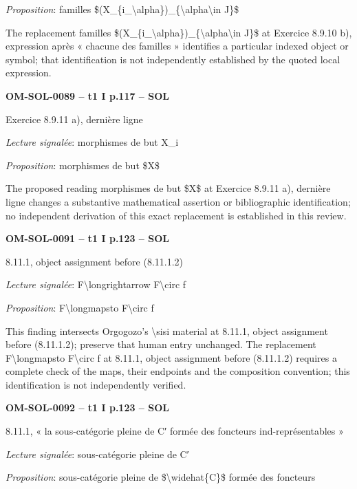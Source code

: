 \emph{Proposition}: familles \$(X\_\{i\_\textbackslash{}alpha\})\_\{\textbackslash{}alpha\textbackslash{}in J\}\$\par
The replacement familles \$(X\_\{i\_\textbackslash{}alpha\})\_\{\textbackslash{}alpha\textbackslash{}in J\}\$ at Exercice 8.9.10 b), expression après « chacune des familles » identifies a particular indexed object or symbol; that identification is not independently established by the quoted local expression.\par
\par\noindent\textbf{OM-SOL-0089 -- t1 I p.117 -- SOL}\par
Exercice 8.9.11 a), dernière ligne\par
\emph{Lecture signalée}: morphismes de but X\_i\par
\emph{Proposition}: morphismes de but \$X\$\par
The proposed reading morphismes de but \$X\$ at Exercice 8.9.11 a), dernière ligne changes a substantive mathematical assertion or bibliographic identification; no independent derivation of this exact replacement is established in this review.\par
\par\noindent\textbf{OM-SOL-0091 -- t1 I p.123 -- SOL}\par
8.11.1, object assignment before (8.11.1.2)\par
\emph{Lecture signalée}: F\textbackslash{}longrightarrow F\textbackslash{}circ f\par
\emph{Proposition}: F\textbackslash{}longmapsto F\textbackslash{}circ f\par
This finding intersects Orgogozo's \textbackslash{}sisi material at 8.11.1, object assignment before (8.11.1.2); preserve that human entry unchanged. The replacement F\textbackslash{}longmapsto F\textbackslash{}circ f at 8.11.1, object assignment before (8.11.1.2) requires a complete check of the maps, their endpoints and the composition convention; this identification is not independently verified.\par
\par\noindent\textbf{OM-SOL-0092 -- t1 I p.123 -- SOL}\par
8.11.1, « la sous-catégorie pleine de C′ formée des foncteurs ind-représentables »\par
\emph{Lecture signalée}: sous-catégorie pleine de C′\par
\emph{Proposition}: sous-catégorie pleine de \$\textbackslash{}widehat\{C\}\$ formée des foncteurs\par
